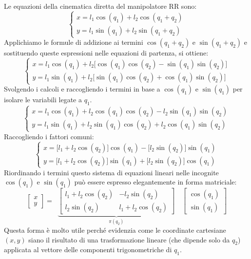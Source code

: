 ﻿\documentclass[11pt, a4paper]{article}
\begin{document}
Le equazioni della cinematica diretta del manipolatore RR sono:
\[
    \begin{cases}
        x = l_1 \cos(q_1) + l_2 \cos(q_1 + q_2) \\
        y = l_1 \sin(q_1) + l_2 \sin(q_1 + q_2)
    \end{cases}
\]
Applichiamo le formule di addizione ai termini $\cos(q_1 + q_2)$ e $\sin(q_1 + q_2)$ e sostituendo queste espressioni nelle equazioni di partenza, si ottiene:
\[
    \begin{cases}
        x = l_1 \cos(q_1) + l_2\biggl[\cos(q_{1})\cos(q_{2}) - \sin(q_{1})\sin(q_{2}) \biggr] \\
        y = l_1 \sin(q_1) + l_2\biggl[ \sin(q_{1})\cos(q_{2}) + \cos(q_{1})\sin(q_{2}) \biggr]
    \end{cases}
\]
Svolgendo i calcoli e raccogliendo i termini in base a $\cos(q_1)$ e $\sin(q_1)$ per isolare le variabili legate a $q_1$.
\[
    \begin{cases}
        x = l_1 \cos(q_1) + l_2\cos(q_{1})\cos(q_{2}) - l_2\sin(q_{1})\sin(q_{2}) \\
        y = l_1 \sin(q_1) + l_2\sin(q_{1})\cos(q_{2}) + l_2\cos(q_{1})\sin(q_{2})
    \end{cases}
\]
Raccogliendo i fattori comuni:
\[
    \begin{cases}
        x = \biggl[l_1 + l_2\cos(q_{2})\biggr]\cos(q_1) - \biggl[l_2\sin(q_{2}) \biggr]\sin(q_{1}) \\
        y = \biggl[l_1 + l_2\cos(q_{2})\biggr]\sin(q_1) + \biggl[l_2\sin(q_{2}) \biggr]\cos(q_{1})
    \end{cases}
\]
Riordinando i termini questo sistema di equazioni lineari nelle incognite $\cos(q_1)$ e $\sin(q_1)$ può essere espresso elegantemente in forma matriciale:
\[
    \begin{bmatrix}
        x\\
        y
    \end{bmatrix}
    =
    \;\;
    \underbrace{\begin{bmatrix}
        l_1 + l_2\cos(q_{2}) & - l_2\sin(q_{2})\\
        l_2\sin(q_{2}) & l_1 + l_2\cos(q_{2})
    \end{bmatrix}}_{\pi(q_{2})}
    \quad
    \begin{bmatrix}
        \cos(q_1)\\
        \sin(q_1)
    \end{bmatrix}
\]
Questa forma è molto utile perché evidenzia come le coordinate cartesiane $(x, y)$ siano il risultato di una trasformazione lineare (che dipende solo da $q_2$) applicata al vettore delle componenti trigonometriche di $q_1$.
\end{document}
